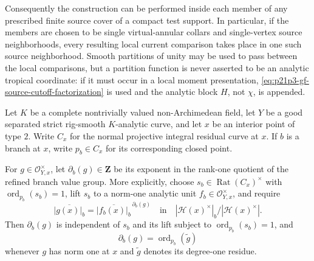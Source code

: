 \begin{lemma}
Consequently the construction can be performed inside each member of any
prescribed finite source cover of a compact test support.  In particular, if
the members are chosen to be single virtual-annular collars and
single-vertex source neighborhoods, every resulting local current comparison
takes place in one such source neighborhood.  Smooth partitions of unity may
be used to pass between the local comparisons, but a partition function is
never asserted to be an analytic tropical coordinate: if it must occur in a
local moment presentation, \eqref{eq:p21p3-gf-source-cutoff-factorization}
is used and the analytic block \(H\), not \(\chi\), is appended.
\end{lemma}

\begin{proposition}
\label{prop:p21p3-gf-virtual-annulus-bridge}
Let \(K\) be a complete nontrivially valued non-Archimedean field, let
\(Y\) be a good separated strict rig-smooth \(K\)-analytic curve, and let \(x\) be an
interior point of type \(2\).  Write \(C_x\) for the normal projective
integral residual curve at \(x\).  If \(b\) is a branch at \(x\), write
\(p_b\in C_x\) for its corresponding closed point.

For \(g\in\mathcal O_{Y,x}^{\times}\), let
\(\partial_b(g)\in\mathbf Z\) be its exponent in the rank-one quotient of
the refined branch value group.  More explicitly, choose
\(s_b\in\operatorname{Rat}(C_x)^{\times}\) with
\(\operatorname{ord}_{p_b}(s_b)=1\), lift \(s_b\) to a norm-one analytic
unit \(f_b\in\mathcal O_{Y,x}^{\times}\), and require
\begin{equation}
\label{eq:p21p3-gf-branch-order-definition}
 \overline{|g(x)|_b}
 =\overline{|f_b(x)|_b}^{\,\partial_b(g)}
 \quad\text{in}\quad
 |\mathcal H(x)^{\times}|_b/|\mathcal H(x)^{\times}|.
\end{equation}
Then \(\partial_b(g)\) is independent of \(s_b\) and its lift subject to
\(\operatorname{ord}_{p_b}(s_b)=1\), and
\begin{equation}
\label{eq:p21p3-gf-branch-order-residue}
 \partial_b(g)=\operatorname{ord}_{p_b}(\widetilde g)
\end{equation}
whenever \(g\) has norm one at \(x\) and \(\widetilde g\) denotes its
degree-one residue.


\end{proposition}
